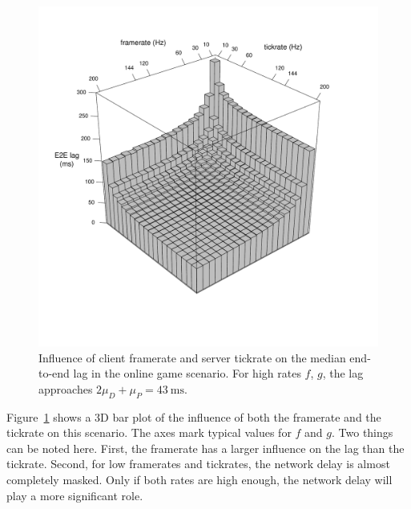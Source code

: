\begin{figure}[!t]
	\centering
	\vspace{-6mm}
	\includegraphics[width=1.0\columnwidth]{../simulation/visualization/e2e-lag-3dbars.pdf}
	\vspace{-15mm}
	\caption{Influence of client framerate and server tickrate on the median end-to-end lag in the online game scenario. For high rates $f$, $g$, the lag approaches $2\mu_D+\mu_P=\SI{43}{\milli\second}$.}
\label{fig:3dbars-framerate-tickrate-lag}
\end{figure}

Figure~\ref{fig:3dbars-framerate-tickrate-lag} shows a 3D bar plot 
of the influence of both the framerate and the tickrate on this 
scenario. The axes mark typical values for $f$ and $g$. Two things 
can be noted here. First, the framerate has a larger influence on 
the lag than the tickrate. Second, for low framerates and tickrates, 
the network delay is almost completely masked. Only if both rates 
are high enough, the network delay will play a more significant role.


